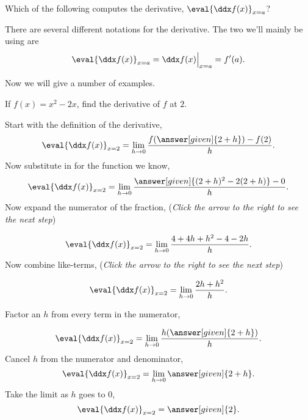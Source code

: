 \documentclass{ximera}
\begin{document}
\begin{question} 
    Which of the following computes the derivative, $\eval{\ddx f(x)}_{x=a}$?
    \begin{selectAll}
    \end{selectAll}
\end{question}


\begin{definition}
  There are several different notations for the derivative.  The two we'll mainly be using are
  \[
  \eval{\ddx f(x)}_{x=a} = \ddx f(x) \Big|_{x=a} = f'(a).
  \]
\end{definition}


Now we will give a number of examples.
\begin{example}
  If $f(x) = x^2-2x$, find the derivative of $f$ at $2$.
  \begin{explanation}
    Start with the definition of the derivative,
    \[
    \eval{\ddx f(x)}_{x=2} = \lim_{h\to 0} \frac{f(\answer[given]{2+h})-f(2)}{h}.
    \] 
     Now substitute in for the function we know,
    \[
    \eval{\ddx f(x)}_{x=2} = \lim_{h\to 0}\frac{\answer[given]{(2+h)^2-2(2+h)} -0}{h}.
    \]
    Now expand the numerator of the fraction, {\color{blue}(\emph{Click the arrow to the right to see the next step})}
    \begin{expandable}
    \[
    \eval{\ddx f(x)}_{x=2} = \lim_{h\to 0} \frac{4+4h+h^2-4-2h }{h}.
    \]
    Now combine like-terms, {\color{blue}(\emph{Click the arrow to the right to see the next step})}
    \begin{expandable}
    \[
    \eval{\ddx f(x)}_{x=2} = \lim_{h\to 0}\frac{2h+h^2}{h}.
    \]

    Factor an $h$ from every term in the numerator,
    \end{expandable}
    \end{expandable}
    \[
    \eval{\ddx f(x)}_{x=2} = \lim_{h\to 0}\frac{h(\answer[given]{2+h})}{h}.
    \]
    Cancel $h$ from the numerator and denominator,
    \[
    \eval{\ddx f(x)}_{x=2} = \lim_{h\to 0}\answer[given]{2+h}. 
    \]
    Take the limit as $h$ goes to $0$,
    \[
    \eval{\ddx f(x)}_{x=2} = \answer[given]{2}.
    \]
\end{explanation}
\end{example}
\end{document}
